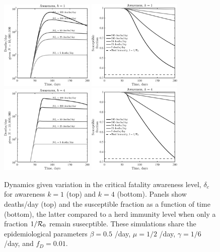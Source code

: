 \begin{figure}[t!]
\begin{center}
\includegraphics[width=0.4\textwidth]{scripts/figseir_Speak_k1_noname.pdf}
\mbox{\hspace{0.05\textwidth}}
\includegraphics[width=0.4\textwidth]{scripts/figseir_Susc_k1_noname.pdf}\\
\includegraphics[width=0.4\textwidth]{scripts/figseir_Speak_k4_noname.pdf}
\mbox{\hspace{0.05\textwidth}}
\includegraphics[width=0.4\textwidth]{scripts/figseir_Susc_k4_noname.pdf}
\caption{Dynamics given variation in the critical fatality awareness
level, $\delta_c$ for awareness $k=1$ (top) and $k=4$ (bottom). Panels show
deaths/day (top) and the susceptible fraction as a function of time (bottom),
the latter compared to a herd immunity
level when only a fraction $1/{\cal{R}}_0$ remain susecptible.
These simulations share the
epidemiological parameters 
$\beta=0.5$ /day, $\mu=1/2$ /day, $\gamma=1/6$ /day,
and $f_D=0.01$.
\label{fig.generic_k1-4}}
\end{center}
\end{figure}

